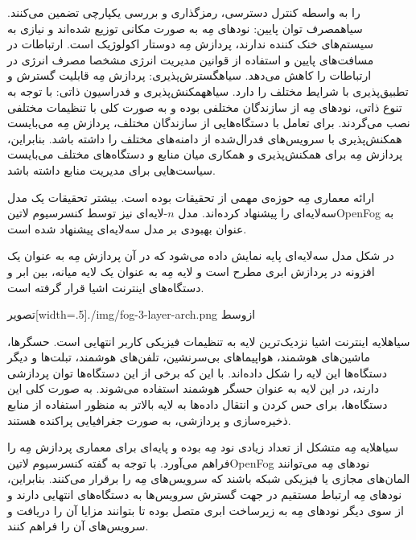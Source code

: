 را به واسطه کنترل دسترسی، رمزگذاری و بررسی یکپارچی تضمین می‌کنند.
 ‌سیاه{مصرف توان پایین}: نودهای مِه به صورت مکانی توزیع شده‌اند و نیازی به سیستم‌های خنک کننده ندارند، پردازش مِه دوستار اکولوژیک است.
ارتباطات در مسافت‌های پایین و استفاده از قوانین مدیریت انرژی مشخصا مصرف انرژی در ارتباطات را کاهش می‌دهد.
 ‌سیاه{گسترش‌پذیری}: پردازش مِه قابلیت گسترش و تطبیق‌پذیری با شرایط مختلف را دارد.
 ‌سیاه{همکنش‌پذیری و فدراسیون ذاتی}: با توجه به تنوع ذاتی، نودهای مِه از سازندگان مختلفی بوده و به صورت کلی با تنظیمات مختلفی نصب می‌گردند.
برای تعامل با دستگاه‌هایی از سازندگان مختلف، پردازش مِه می‌بایست همکنش‌پذیری با سرویس‌های فدرال‌شده از دامنه‌های مختلف را داشته باشد.
بنابراین، پردازش مِه برای همکنش‌پذیری و همکاری میان منابع و دستگاه‌های مختلف می‌بایست سیاست‌هایی برای مدیریت منابع داشته باشد.


ارائه معماری مِه حوزه‌ی مهمی از تحقیقات بوده است. بیشتر تحقیقات یک مدل سه‌لایه‌ای را پیشنهاد کرده‌اند.
مدل $n$-لایه‌ای نیز توسط کنسرسیوم ‌لاتین{OpenFog} به عنوان بهبودی بر مدل سه‌لایه‌ای پیشنهاد شده است.

در شکل  مدل سه‌لایه‌ای پایه نمایش داده می‌شود که در آن پردازش مِه به عنوان
یک افزونه در پردازش ابری مطرح است و لایه مِه به عنوان یک لایه میانه، بین ابر و دستگاه‌های اینترنت اشیا قرار گرفته است.

‌تصویر[width=.5\textwidth]{./img/fog-3-layer-arch.png}
‌ازوسط

‌سیاه{لایه اینترنت اشیا} نزدیک‌ترین لایه به تنظیمات فیزیکی کاربر انتهایی است. حسگرها، ماشین‌های هوشمند، هواپیماهای بی‌سرنشین،
تلفن‌های هوشمند، تبلت‌ها و دیگر دستگاه‌ها این لایه را شکل داده‌اند. با این که برخی از این دستگاه‌ها توان پردازشی دارند، در این لایه
به عنوان حسگر هوشمند استفاده می‌شوند. به صورت کلی این دستگاه‌ها، برای حس کردن و انتقال داده‌ها
به لایه بالاتر به منظور استفاده از منابع ذخیره‌سازی و پردازشی، به صورت جغرافیایی پراکنده هستند.

‌سیاه{لایه مِه} متشکل از تعداد زیادی نود مِه بوده و پایه‌ای برای معماری پردازش مِه را فراهم می‌آورد.
با توجه به گفته کنسرسیوم ‌لاتین{OpenFog} نودهای مِه می‌توانند المان‌های مجازی یا فیزیکی شبکه باشند که سرویس‌های مِه را برقرار می‌کنند.
بنابراین، نودهای مِه ارتباط مستقیم در جهت گسترش سرویس‌ها به دستگاه‌های انتهایی دارند و از سوی دیگر نودهای مِه به زیرساخت ابری متصل بوده تا بتوانند
مزایا آن را دریافت و سرویس‌های آن را فراهم کنند.

